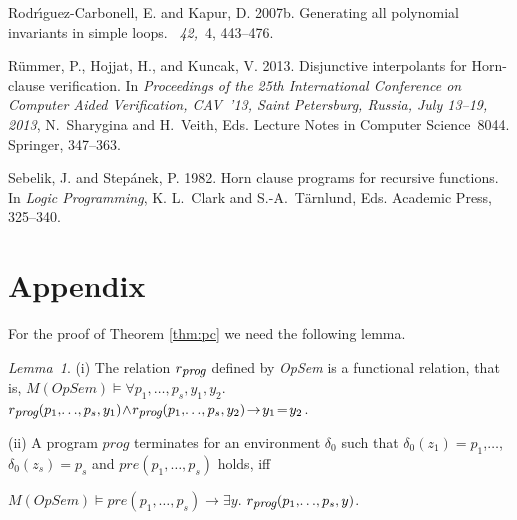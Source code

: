 \documentclass[english]{tlp}
\begin{document}
\begin{thebibliography}{}
{\sc Rodr{\'{\i}}guez{-}Carbonell, E.} {\sc and} {\sc Kapur, D.} 2007b.
\newblock Generating all polynomial invariants in simple loops.
~{\em 42,\/}~4, 443--476.

{\sc R{\"u}mmer, P.}, {\sc Hojjat, H.}, {\sc and} {\sc Kuncak, V.} 2013.
\newblock Disjunctive interpolants for {H}orn-clause verification.
\newblock In {\em Proceedings of the 25th International Conference on Computer
  Aided Verification, {CAV}~'13, Saint Petersburg, Russia, July 13--19, 2013},
  {N.~Sharygina} {and} {H.~Veith}, Eds. Lecture Notes in Computer Science~8044.
  Springer, 347--363.

{\sc Sebelik, J.} {\sc and} {\sc Step{\'{a}}nek, P.} 1982.
\newblock Horn clause programs for recursive functions.
\newblock In {\em Logic Programming},
  {K. L.~Clark} {and} {S.-A.~T{\"a}rnlund}, Eds. 
  Academic Press, 325--340.



\end{thebibliography}

\newpage

\section*{Appendix}


For the proof of Theorem \ref{thm:pc} we need the following lemma.

\medskip
\noindent
{\it Lemma~1}. (i) The relation $r_{\textit{\small prog}}$ defined by \textit{OpSem} is a functional relation, that is, 
$M(\textit{OpSem}) \models \forall p_1,\!\ldots\!,p_s,y_1,y_2$.$r_{\textit{\small prog}}(p_1,\!\ldots\!,p_s,y_1) 
\!\wedge\! r_{\textit{\small prog}}(p_1,\!\ldots\!,p_s,y_2)\! \rightarrow\! y_1\!=\!y_2$.

\noindent
(ii) A program
${\textit{prog}}$ terminates for an environment $\delta_0$ such that
\mbox{$\delta_{0}(z_{1})\!=\!p_{1}$},$\ldots$, $\delta_{0}(z_{s})\!=\!p_{s}$
and $\textit{pre}(p_1,\!\ldots\!,p_s)$ holds, iff

$M(\textit{OpSem}) \models \textit{pre}(p_1,\!\ldots\!,p_s) 
 \rightarrow \exists y$. $r_{\textit{\small prog}}(p_1,\!\ldots\!,p_s,y) $.
\end{document}
